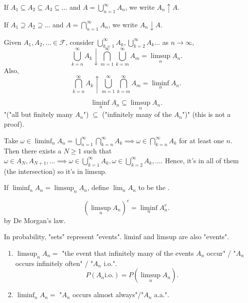 \documentclass[class=article,crop=false]{standalone}
\begin{document}
\begin{defn}[]
If $A_1 \subseteq A_2 \subseteq A_3 \subseteq  \ldots$ and $A = \bigcup_{ n =1}^{\infty} A_n$, we write $A_n \uparrow A$. 
\end{defn}

\begin{defn}[]
If $ A_1 \supseteq A_2 \supseteq \ldots$ and $ A= \bigcap_{ n=1}^{\infty} A_n $, we write $A_n \downarrow A$.
\end{defn}

\begin{eg}[]
Given $A_1,A_2,\ldots \in \mathcal{F}$, consider $\bigcup_{ k =1}^{\infty} A_k, \bigcup_{ k =2}^{\infty} A_k \ldots  $ as $n \to \infty$, 
\[
\bigcup_{ k =n}^{\infty} A_k \downarrow \bigcap_{ m=1}^{\infty} \bigcup_{k=m}^{\infty} A_m = \limsup_{ n} A_n
.\] 
Also,
\[
\bigcap_{ k =n}^{\infty} A_k \uparrow \bigcup_{ m=1}^{\infty} \bigcap_{k=m}^{\infty} A_m = \liminf_{ n} A_n
.\] 
\end{eg}

\begin{note}[]
\[
\liminf_{ n} A_n \subseteq \limsup_{ n} A_n
.\] 
"("all but finitely many $A_n$") $\subseteq $ ("infinitely many of the $A_n$")" (this is not a proof).
\end{note}
\begin{prf}
	Take $\omega \in \liminf_{ n} A_n = \bigcup_{ n= 1}^{\infty} \bigcap_{k= n}^{\infty} A_k \implies \omega \in \bigcap_{ k =n}^{\infty} A_k$ for at least one $n$. Then there exists a  $N \geq 1$  such that $\omega \in A_N, A_{N+1},\ldots \implies \omega \in \bigcup_{ k =1}^{\infty} A_k, \omega \in \bigcup_{ k =2}^{\infty} A_k,\ldots$. Hence, it's in all of them (the intersection) so it's in limsup.
\end{prf}

\begin{defn}
If $\liminf_{ n} A_n = \limsup_{ n} A_n$, define $\lim_n A_n$ to be the  .
\end{defn}

\begin{lem}[]
\[
	\left( \limsup_{ n} A_n \right)^{c} =  \liminf_{ n} A_n^{c}
.\] 
by De Morgan's law.
\end{lem}


In probability, "sets" represent "events". liminf and limsup are also "events".
\begin{enumerate}[label=\arabic*)]
	\item $\limsup_{ n} A_n =$ "the event that infinitely many of the events $A_n$ occur" / "$A_n$ occurs infinitely often" / "$A_n$ i.o.".
		\[
			P(A_n \text{i.o.} ) = P(\limsup_{ n} A_n)
		.\] 
	\item $\liminf_{ n} A_n = $ "$A_n$ occurs almost always"/"$A_n$ a.a.".
\end{enumerate}
\end{document}
